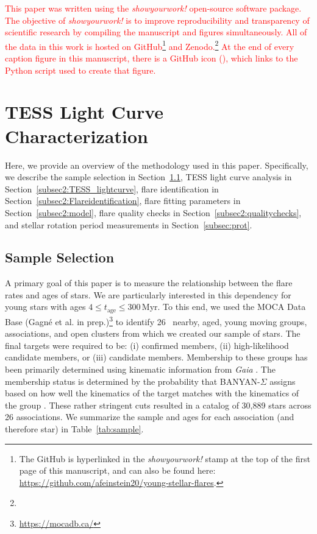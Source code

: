 \documentclass[twocolumn, linenumbers]{aastex631}
\begin{document}
\textcolor{red}{This paper was written using the \textit{showyourwork!} open-source
software package. The objective of \textit{showyourwork!} is to improve reproducibility
and transparency of scientific research by compiling the manuscript and figures
simultaneously. All of the data in this work is hosted on GitHub\footnote{The GitHub is
hyperlinked in the \textit{showyourwork!} stamp at the top of the first page of this manuscript,
 and can also be found here: \url{https://github.com/afeinstein20/young-stellar-flares}.} and
 Zenodo.\footnote{} At the end of every caption figure in this manuscript, there is a GitHub icon
 (\faGithub), which links to the Python script used to create that figure.}

\section{TESS Light Curve Characterization}\label{sec:methods}

Here, we provide an overview of the methodology used in this paper. Specifically, we describe
the sample selection in Section~\ref{subsec2:sample}, TESS light curve analysis in
Section~\ref{subsec2:TESS_lightcurve}, flare identification in Section~\ref{subsec2:Flareidentification},
flare fitting parameters in Section~\ref{subsec2:model}, flare quality checks in
Section~\ref{subsec2:qualitychecks}, and  stellar rotation period measurements in Section~\ref{subsec:prot}.

\subsection{Sample Selection}\label{subsec2:sample}

A primary goal of this paper is to measure the relationship between the flare rates and
ages of stars. We are particularly interested in this dependency for young stars with ages
$4 \leq t_\textrm{age} \leq 300$\,Myr. To this end, we used the MOCA Data Base (Gagné et al.
in prep.)\footnote{\url{https://mocadb.ca/}} to identify 26~ nearby, aged, young moving groups,
associations, and open clusters from which we created our sample of stars. The final targets
were required to be: (i) confirmed members, (ii) high-likelihood candidate members, or (iii)
candidate members.  Membership to these groups has been primarily determined using kinematic
information from \textit{Gaia} \citep{gaia16, gaia18}. The membership status is determined by
the probability that BANYAN-$\Sigma$ assigns based on how well the kinematics of the target
matches with the kinematics of the group \citep{gagne18}. These rather stringent cuts resulted
in a catalog of 30,889 stars across 26 associations. We summarize the sample and ages for each
association (and therefore star) in Table~\ref{tab:sample}.
\end{document}
